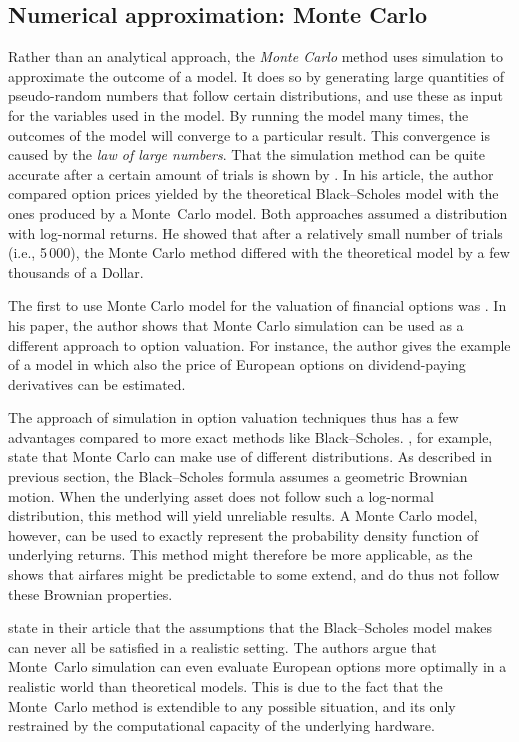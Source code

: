 \subsection{Numerical approximation: Monte Carlo}
Rather than an analytical approach, the \emph{Monte Carlo} method uses simulation to approximate the outcome of a model. It does so by generating large quantities of pseudo-random numbers that follow certain distributions, and use these as input for the variables used in the model.  By running the model many times, the outcomes of the model will converge to a particular result. This convergence is caused by the \emph{law of large numbers}. That the simulation method can be quite accurate after a certain amount of trials is shown by . In his article, the author compared option prices yielded by the theoretical Black--Scholes model with the ones produced by a Monte~Carlo model. Both approaches assumed a distribution with log-normal returns. He showed that after a relatively small number of trials (i.e., 5\,000), the Monte Carlo method differed with the theoretical model by a few thousands of a Dollar.

The first to use Monte Carlo model for the valuation of financial options was . In his paper, the author shows that Monte Carlo simulation can be used as a different approach to option valuation. For instance, the author gives the example of a model in which also the price of European options on dividend-paying derivatives can be estimated.

The approach of simulation in option valuation techniques thus has a few advantages compared to more exact methods like Black--Scholes. , for example, state that Monte Carlo can make use of different distributions. As described in previous section, the Black--Scholes formula assumes a geometric Brownian motion. When the underlying asset does not follow such a log-normal distribution, this method will yield unreliable results. A Monte Carlo model, however, can be used to exactly represent the probability density function of underlying returns. This method might therefore be more applicable, as the  shows that airfares might be predictable to some extend, and do thus not follow these Brownian properties.

 state in their article that the assumptions that the Black--Scholes model makes can never all be satisfied in a realistic setting. The authors argue that Monte~Carlo simulation can even evaluate European options more optimally in a realistic world than theoretical models. This is due to the fact that the Monte~Carlo method is extendible to any possible situation, and its only restrained by the computational capacity of the underlying hardware.

